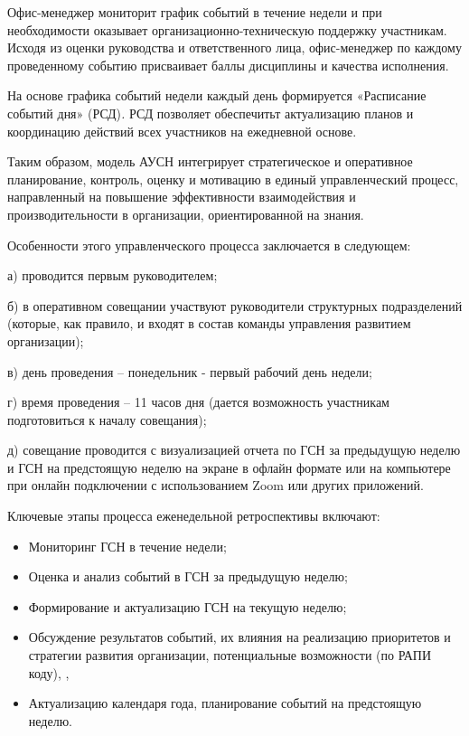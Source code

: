 Офис-менеджер мониторит график событий в течение недели и при
необходимости оказывает организационно-техническую поддержку участникам.
Исходя из оценки руководства и ответственного лица, офис-менеджер по
каждому проведенному событию присваивает баллы дисциплины и качества
исполнения.

На основе графика событий недели каждый день формируется «Расписание
событий дня» (РСД)\emph{.} РСД позволяет обеспечитьт актуализацию планов
и координацию действий всех участников на ежедневной основе.

Таким образом, модель АУСН интегрирует стратегическое и оперативное
планирование, контроль, оценку и мотивацию в единый управленческий
процесс, направленный на повышение эффективности взаимодействия и
производительности в организации, ориентированной на знания.

Особенности этого управленческого процесса заключается в следующем:

а) проводится первым руководителем;

б) в оперативном совещании участвуют руководители структурных
подразделений (которые, как правило, и входят в состав команды
управления развитием организации);

в) день проведения -- понедельник - первый рабочий день недели;

г) время проведения -- 11 часов дня (дается возможность участникам
подготовиться к началу совещания);

д) совещание проводится с визуализацией отчета по ГСН за предыдущую
неделю и ГСН на предстоящую неделю на экране в офлайн формате или на
компьютере при онлайн подключении с использованием Zoom или других
приложений.

Ключевые этапы процесса еженедельной ретроспективы включают:

\begin{itemize}
\item
  Мониторинг ГСН в течение недели;
\item
  Оценка и анализ событий в ГСН за предыдущую неделю;
\item
  Формирование и актуализацию ГСН на текущую неделю;
\item
  Обсуждение результатов событий, их влияния на реализацию приоритетов и
  стратегии развития организации, потенциальные возможности (по РАПИ
  коду), ,
\item
  Актуализацию календаря года, планирование событий на предстоящую
  неделю.
\end{itemize}

